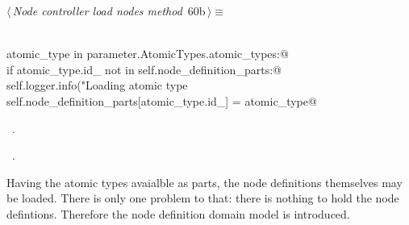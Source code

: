 \documentclass[
    a4paper,      %
    10pt,         %
    openright,    %
    notitlepage,  %
    parskip=half, %
]{scrreprt}       %
\theoremstyle{definition}                    %
\begin{document}
\begin{flushleft} \small
\begin{minipage}{\linewidth}\label{scrap101}\raggedright\small
{} $\langle\,${\itshape Node controller load nodes method}\nobreak\ {\footnotesize {60b}}$\,\rangle\equiv$
\vspace{-1ex}
\begin{list}{}{} \item
\mbox{}\lstinline@@\\
\mbox{}\lstinline@for atomic_type in parameter.AtomicTypes.atomic_types:@\\
\mbox{}\lstinline@    if atomic_type.id_ not in self.node_definition_parts:@\\
\mbox{}\lstinline@        self.logger.info("Loading atomic type %s", atomic_type.type_)@\\
\mbox{}\lstinline@        self.node_definition_parts[atomic_type.id_] = atomic_type@{\NWsep}
\end{list}
\vspace{-1.5ex}
\footnotesize
\begin{list}{}{\setlength{\itemsep}{-\parsep}\setlength{\itemindent}{-\leftmargin}}
\item \NWtxtMacroDefBy\ .
\item \NWtxtMacroRefIn\ .

\item{}
\end{list}
\end{minipage}\vspace{4ex}
\end{flushleft}
Having the atomic types avaialble as parts, the node definitions themselves may
be loaded. There is only one problem to that: there is nothing to hold the
node defintions. Therefore the node definition domain model is introduced.
\end{document}
